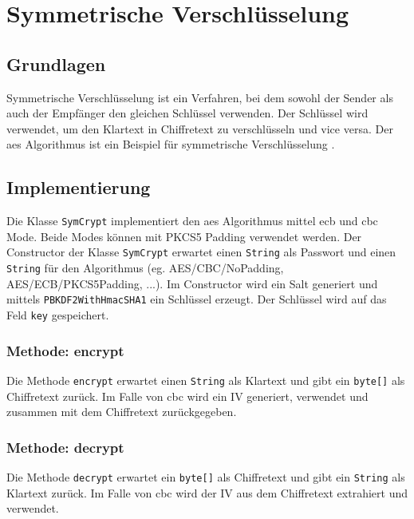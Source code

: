 \chapter{Symmetrische Verschlüsselung}

\section{Grundlagen}
Symmetrische Verschlüsselung ist ein Verfahren, bei dem sowohl der Sender als auch der Empfänger den gleichen Schlüssel verwenden. Der Schlüssel wird verwendet, um den Klartext in Chiffretext zu verschlüsseln und vice versa. Der \gls{aes} Algorithmus ist ein Beispiel für symmetrische Verschlüsselung \cite{rfc3826}.

\section{Implementierung}
Die Klasse \texttt{SymCrypt} implementiert den \gls{aes} Algorithmus mittel \gls{ecb} und \gls{cbc} Mode. Beide Modes können mit PKCS5 Padding verwendet werden. Der Constructor der Klasse \texttt{SymCrypt} erwartet einen \texttt{String} als Passwort und einen \texttt{String} für den Algorithmus (eg. \glqq AES/CBC/NoPadding\grqq, \glqq AES/ECB/PKCS5Padding\grqq , ...).
Im Constructor wird ein Salt generiert und mittels \texttt{PBKDF2WithHmacSHA1} ein Schlüssel erzeugt. Der Schlüssel wird auf das Feld \texttt{key} gespeichert.

\subsection{Methode: encrypt}
Die Methode \texttt{encrypt} erwartet einen \texttt{String} als Klartext und gibt ein \texttt{byte[]} als Chiffretext zurück. Im Falle von \gls{cbc} wird ein IV generiert, verwendet und zusammen mit dem Chiffretext zurückgegeben.

\subsection{Methode: decrypt}
Die Methode \texttt{decrypt} erwartet ein \texttt{byte[]} als Chiffretext und gibt ein \texttt{String} als Klartext zurück. Im Falle von \gls{cbc} wird der IV aus dem Chiffretext extrahiert und verwendet.
